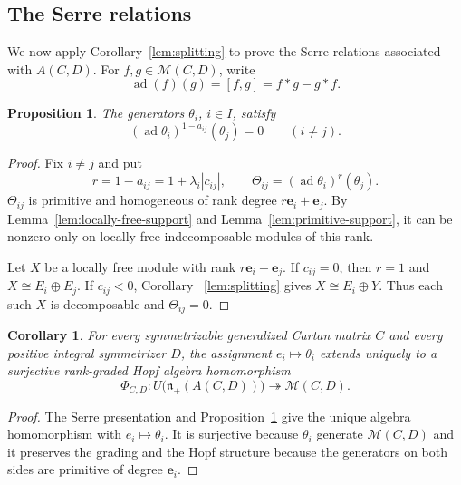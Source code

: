 \documentclass[12pt,reqno]{amsart}
\numberwithin{equation}{section}
\newtheorem{proposition}[theorem]{Proposition}
\newtheorem{corollary}[theorem]{Corollary}
\theoremstyle{definition}
\theoremstyle{remark}
\newcommand{\M}{\mathcal M}
\newcommand{\nplus}{\mathfrak n_+}
\newcommand{\ad}{\operatorname{ad}}
\theoremstyle{plain}
\theoremstyle{plain}
\begin{document}
\subsection{The Serre relations}\label{subsec:Serre}
We now apply Corollary~\ref{lem:splitting} to prove the Serre relations associated with $A(C,D)$. For $f,g\in\mathcal M(C,D)$, write
\[
   \ad(f)(g)=[f,g]=f*g-g*f.
\]

\begin{proposition}\label{prop:A-Serre}
The generators $\theta_i$, $i\in I$, satisfy
\begin{equation}\label{eq:A-Serre}
(\ad\theta_i)^{1-a_{ij}}(\theta_j)=0 \qquad (i\ne j).
\end{equation}
\end{proposition}

\begin{proof}
    Fix $i \neq j$ and put
\[
   r=1-a_{ij}=1+\lambda_i|c_{ij}|, \qquad \Theta_{ij}=(\ad\theta_i)^r(\theta_j).
\]
$\Theta_{ij}$ is primitive and homogeneous of rank degree $r\mathbf e_i+\mathbf e_j$. By Lemma~\ref{lem:locally-free-support} and Lemma~\ref{lem:primitive-support}, it can be nonzero only on locally free indecomposable modules of this rank.

Let $X$ be a locally free module with rank $r\mathbf e_i+\mathbf e_j$. If $c_{ij}=0$, then $r=1$ and $X \cong E_i \oplus E_j$. If $c_{ij}<0$, Corollary ~\ref{lem:splitting} gives $X\cong E_i\oplus Y$. Thus each such $X$ is decomposable and $\Theta_{ij}=0$.
\end{proof}

\begin{corollary}\label{cor:canonical-surjection}
For every symmetrizable generalized Cartan matrix $C$ and every positive integral symmetrizer $D$, the assignment $e_i\mapsto\theta_i$ extends uniquely to a surjective rank-graded Hopf algebra homomorphism
\begin{equation}\label{eq:canonical-surjection}
\Phi_{C,D}\colon U\bigl(\nplus(A(C,D))\bigr) \twoheadrightarrow \mathcal M(C,D).
\end{equation}
\end{corollary}

\begin{proof}
 The Serre presentation and Proposition~\ref{prop:A-Serre} give the unique algebra homomorphism with $e_i\mapsto\theta_i$. It is surjective because $\theta_i$ generate $\M(C,D)$ and it preserves the grading and the Hopf structure because the generators on both sides are primitive of degree $\mathbf e_i$.
\end{proof}
\end{document}
